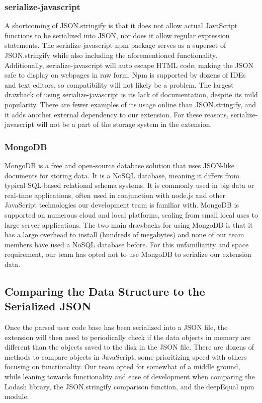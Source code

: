 \documentclass[letterpaper,10pt,titlepage,draftclsnofoot,onecolumn,onesided] {IEEEtran}
\begin{document}
\subsubsection{serialize-javascript}
A shortcoming of JSON.stringify is that it does not allow actual JavaScript functions to be serialized into JSON, nor does it allow regular expression statements. 
The serialize-javascript npm package serves as a superset of JSON.stringify while also including the aforementioned functionality. 
Additionally, serialize-javascript will auto escape HTML code, making the JSON  safe to display on webpages in raw form. 
Npm is supported by dozens of IDEs and text editors, so compatibility will not likely be a problem. 
The largest drawback of using serialize-javascript is its lack of documentation, despite its mild popularity. 
There are fewer examples of its usage online than JSON.stringify, and it adds another external dependency to our extension. 
For these reasons, serialize-javascript will not be a part of the storage system in the extension. \cite{serialize}

\subsubsection{MongoDB}
MongoDB is a free and open-source database solution that uses JSON-like documents for storing data. 
It is a NoSQL database, meaning it differs from typical SQL-based relational schema systems. 
It is commonly used in big-data or real-time applications, often used in conjunction with node.js and other JavaScript technologies our development team is familiar with. 
MongoDB is supported on numerous cloud and local platforms, scaling from small local uses to large server applications. 
The two main drawbacks for using MongoDB is that it has a large overhead to install (hundreds of megabytes) and none of our team members have used a NoSQL database before. 
For this unfamiliarity and space requirement, our team has opted not to use MongoDB to serialize our extension data. \cite{mongo}

\subsection{Comparing the Data Structure to the Serialized JSON}
Once the parsed user code base has been serialized into a JSON file, the extension will then need to periodically check if the data objects in memory are different than the objects saved to the disk in the JSON file. 
There are dozens of methods to compare objects in JavaScript, some prioritizing speed with others focusing on functionality. Our team opted for somewhat of a middle ground, while leaning towards functionality and ease of development when comparing the Lodash library, the JSON.stringify comparison function, and the deepEqual npm module.
\\
\end{document}
